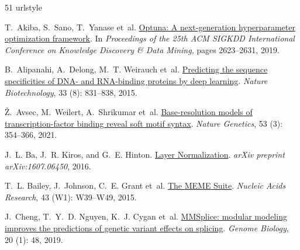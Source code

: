 \begin{thebibliography}{51}
\providecommand{\natexlab}[1]{#1}
\providecommand{\url}[1]{\texttt{#1}}
\expandafter\ifx\csname urlstyle\endcsname\relax
  \providecommand{\doi}[1]{doi: #1}\else
  \providecommand{\doi}{doi: \begingroup \urlstyle{rm}\Url}\fi

T.~Akiba, S.~Sano, T.~Yanase et~al.
\newblock \href{https://doi.org/10.1145/3292500.3330701}{Optuna: A
  next-generation hyperparameter optimization framework}.
\newblock In \emph{Proceedings of the 25th ACM SIGKDD International Conference
  on Knowledge Discovery \& Data Mining}, pages 2623--2631, 2019.

B.~Alipanahi, A.~Delong, M.~T. Weirauch et~al.
\newblock \href{https://doi.org/10.1038/nbt.3300}{Predicting the sequence
  specificities of DNA- and RNA-binding proteins by deep learning}.
\newblock \emph{Nature Biotechnology}, 33 (8): 831--838,
  2015.

{\v Z}.~Avsec, M.~Weilert, A.~Shrikumar et~al.
\newblock \href{https://doi.org/10.1038/s41588-021-00782-6}{Base-resolution
  models of transcription-factor binding reveal soft motif syntax}.
\newblock \emph{Nature Genetics}, 53 (3): 354--366, 2021.

J.~L. Ba, J.~R. Kiros, and G.~E. Hinton.
\newblock \href{https://doi.org/10.48550/arXiv.1607.06450}{Layer
  Normalization}.
\newblock \emph{arXiv preprint arXiv:1607.06450}, 2016.

T.~L. Bailey, J.~Johnson, C.~E. Grant et~al.
\newblock \href{https://doi.org/10.1093/nar/gkv416}{The {MEME} Suite}.
\newblock \emph{Nucleic Acids Research}, 43 (W1): W39--W49,
  2015.

J.~Cheng, T.~Y.~D. Nguyen, K.~J. Cygan et~al.
\newblock \href{https://doi.org/10.1186/s13059-019-1653-z}{{MMSplice}: modular
  modeling improves the predictions of genetic variant effects on splicing}.
\newblock \emph{Genome Biology}, 20 (1): 48, 2019.


\end{thebibliography}
